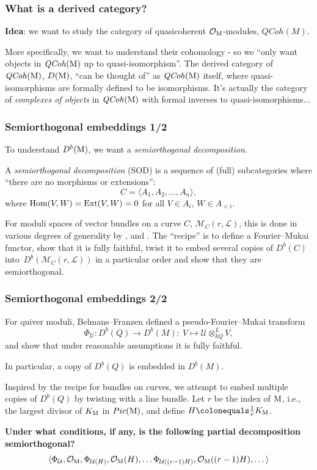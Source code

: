 \documentclass{beamer}
\begin{document}
\begin{frame}
    \frametitle{What is a derived category?}
\textbf{Idea}: we want to study the category of
quasicoherent $\mathcal{O}_{\operatorname{M}}$-modules, $\mathit{QCoh}(M)$.

More specifically, we want to understand their cohomology -
so we ``only want objects in $\mathit{QCoh}(\operatorname{M})$ up to quasi-isomorphism''. \pause
\vfill
The derived category of $\mathit{QCoh}(\operatorname{M})$, $D(\operatorname{M})$,
``can be thought of'' as $\mathit{QCoh}(\operatorname{M})$ itself, where quasi-isomorphisms are
formally defined to be isomorphisms. \pause
\vfill
\small{It's actually the category of \emph{complexes of objects} in $\mathit{QCoh}(\operatorname{M})$
with formal inverses to quasi-isomorphisms...}

\end{frame}
\begin{frame}
    \frametitle{Semiorthogonal embeddings 1/2}
To understand $D^b(\operatorname{M})$, we want a \emph{semiorthogonal decomposition}.

\begin{definition}
A \emph{semiorthogonal decomposition} (SOD) is a sequence of (full) subcategories
where ``there are no morphisms or extensions'':
\[
   \mathit{C} = \langle A_1, A_2, \dots, A_n \rangle,
\]
where $\operatorname{Hom}(V, W) = \operatorname{Ext}(V, W) = 0$ for all $V \in A_i$, $W \in A_{< i}$.
\end{definition}\pause

For moduli spaces of vector bundles on a curve $C$,
$\mathcal{M}_{C}(r, \mathcal{L})$, this is done in various degrees of generality by
\cite{MR3713871, MR3880395, MR3764066}, \cite{MR3954042} and \cite{MR4651618}.
The ``recipe'' is to define a Fourier--Mukai functor, show that it is
fully faithful, twist it to embed several copies of $D^b(C)$
into~$D^b(\mathcal{M}_{C}(r, \mathcal{L}))$ in a particular order and show
that they are semiorthogonal.

\end{frame}

\begin{frame}
    \frametitle{Semiorthogonal embeddings 2/2}
For quiver moduli, Belmans--Franzen \cite{vector-fields-paper}
defined a pseudo-Fourier--Mukai transform
\[\Phi_{\mathcal{U}} : D^b(Q) \to D^b(M) :~V \mapsto \mathcal{U} \otimes_{k Q}^{L} V, \]
and show that under reasonable assumptions it is fully faithful.

In particular, a copy of $D^b(Q)$ is embedded in $D^b(M)$. \pause

Inspired by the recipe for bundles on curves, we attempt to embed
multiple copies of $D^b(Q)$ by twisting with a line bundle. \pause
\vfill
Let $r$ be the index of $\operatorname{M}$, i.e.,
the largest divisor of $K_{\operatorname{M}}$ in $Pic(\operatorname{M})$, and
define $H \colonequals \frac{1}{r}K_{\modulispace}$. \pause

\textbf{Under what conditions, if any, is the following partial decomposition semiorthogonal?}
\[
    \langle
    \Phi_{\mathcal{U}}, \mathcal{O}_{\operatorname{M}},
    \Phi_{\mathcal{U}(H)}, \mathcal{O}_{\operatorname{M}}(H), \dots
    \Phi_{\mathcal{U}((r-1)H)}, \mathcal{O}_{\operatorname{M}}((r-1)H), \dots
    \rangle
\]
\end{frame}
\end{document}

